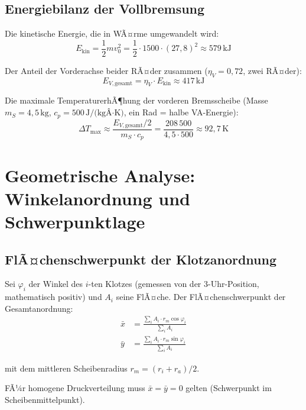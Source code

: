 ﻿\documentclass[12pt,a4paper]{article}
\theoremstyle{definition}
\begin{document}
\subsection{Energiebilanz der Vollbremsung}

Die kinetische Energie, die in WÃ¤rme umgewandelt wird:
\begin{equation}
  E_{\text{kin}} = \frac{1}{2} m v_0^2
  = \frac{1}{2} \cdot 1500 \cdot (27{,}8)^2
  \approx 579\,\text{kJ}
  \label{eq:ekin}
\end{equation}

Der Anteil der Vorderachse beider RÃ¤der zusammen ($\eta_V = 0{,}72$,
zwei RÃ¤der):
\begin{equation}
  E_{V,\text{gesamt}} = \eta_V \cdot E_{\text{kin}} \approx 417\,\text{kJ}
  \label{eq:E_VA}
\end{equation}

Die maximale TemperaturerhÃ¶hung der vorderen Bremsscheibe
(Masse $m_S = 4{,}5\,\text{kg}$, $c_p = 500\,\text{J/(kgÂ·K)}$,
ein Rad = halbe VA-Energie):
\begin{equation}
  \Delta T_{\max} \approx \frac{E_{V,\text{gesamt}} / 2}{m_S \cdot c_p}
  = \frac{208\,500}{4{,}5 \cdot 500} \approx 92{,}7\,\text{K}
  \label{eq:deltaT}
\end{equation}

\section{Geometrische Analyse: Winkelanordnung und Schwerpunktlage}

\subsection{FlÃ¤chenschwerpunkt der Klotzanordnung}

Sei $\varphi_i$ der Winkel des $i$-ten Klotzes (gemessen von der
3-Uhr-Position, mathematisch positiv) und $A_i$ seine FlÃ¤che.
Der FlÃ¤chenschwerpunkt der Gesamtanordnung:
\begin{align}
  \bar{x} &= \frac{\sum_i A_i \cdot r_m \cos\varphi_i}{\sum_i A_i}
  \label{eq:sx} \\[4pt]
  \bar{y} &= \frac{\sum_i A_i \cdot r_m \sin\varphi_i}{\sum_i A_i}
  \label{eq:sy}
\end{align}

mit dem mittleren Scheibenradius $r_m = (r_i + r_a)/2$.

FÃ¼r homogene Druckverteilung muss $\bar{x} = \bar{y} = 0$ gelten
(Schwerpunkt im Scheibenmittelpunkt).
\end{document}
